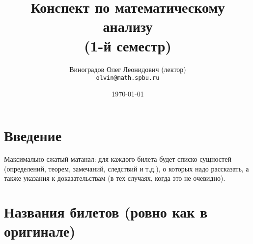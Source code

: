 \documentclass[12pt, a4paper]{article}
\title{Конспект по математическому анализу \\(1-й семестр)}
\author{
  \vova
  \and
  Виноградов Олег Леонидович (лектор)\\
  \texttt{olvin@math.spbu.ru}
}
\date{\today}
\begin{document}
\maketitle
\newpage
\tableofcontents
\newpage


\section{Введение}

Максимально сжатый матанал: 
для каждого билета будет списко сущностей 
(определений, теорем, замечаний, следствий и т.д.),
о которых надо рассказать, а также указания к доказательствам
(в тех случаях, когда это не очевидно).

\section{Названия билетов (ровно как в оригинале)}
\end{document}
